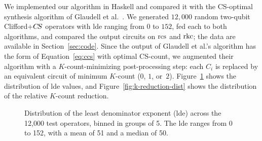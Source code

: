 \documentclass[reprint,amsmath,amssymb,aps,pra]{revtex4-2}
\begin{document}
We implemented our algorithm in Haskell and compared it with the
CS-optimal synthesis algorithm of Glaudell et
al.~\cite{Glaudell2021}. We generated $12{,}000$ random two-qubit
Clifford+$C\kern-.16667em S$ operators with lde ranging from $0$ to $152$, fed each
to both algorithms, and compared the output circuits on $\operatorname{rcs}$ and
$\operatorname{rkc}$; the data are available in Section~\ref{sec:code}. Since the
output of Glaudell et al.'s algorithm has the form of
Equation~\eqref{eq:ccs} with optimal CS-count, we augmented their
algorithm with a $K$-count-minimizing post-processing step: each $C_i$
is replaced by an equivalent circuit of minimum $K$-count ($0$, $1$,
or~$2$). Figure~\ref{fig:lde-dist} shows the distribution of lde
values, and Figure~\ref{fig:k-reduction-dist} shows the distribution
of the relative $K$-count reduction.


\begin{figure}
  \centering
  \caption{Distribution of the least denominator exponent (lde) across
    the 12{,}000 test operators, binned in groups of 5. The lde ranges
    from 0 to 152, with a mean of 51 and a median of 50.}
  \label{fig:lde-dist}
\end{figure}
\end{document}
